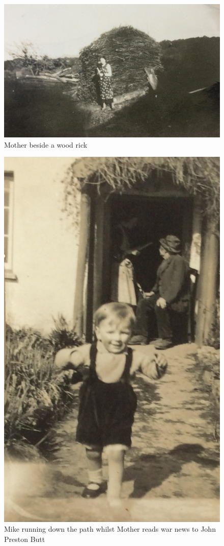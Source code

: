 \begin{figure}
  \centering
  \includegraphics[width=.9\linewidth]{pictures/cropped/Mother beside a wood rick.jpg}
  \caption*{Mother beside a wood rick}
\end{figure}

\begin{figure}
  \centering
  \includegraphics[width=.9\linewidth]{pictures/cropped/Mike running down the path whilst Mother is reading War news to John Preston Butt.jpg}
  \caption*{Mike running down the path whilst Mother reads war news to John Preston Butt}
\end{figure}

